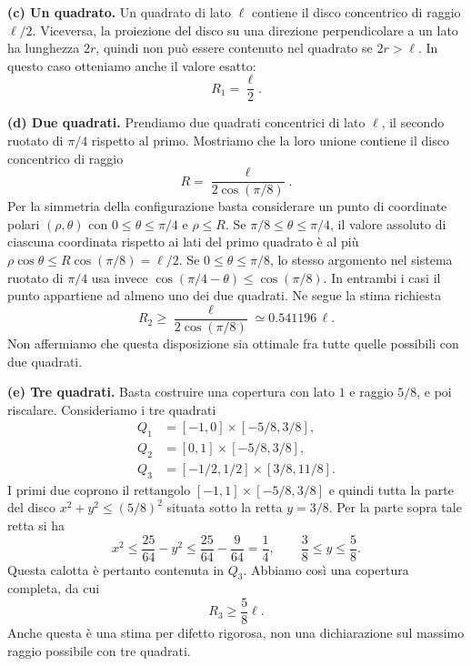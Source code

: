 {\textbf{(c) Un quadrato.}
Un quadrato di lato $\ell$ contiene il disco concentrico di raggio $\ell/2$.
Viceversa, la proiezione del disco su una direzione perpendicolare a un lato
ha lunghezza $2r$, quindi non pu\`o essere contenuto nel quadrato se
$2r>\ell$. In questo caso otteniamo anche il valore esatto:
\[
R_1=\frac\ell2.
\]

\textbf{(d) Due quadrati.}
Prendiamo due quadrati concentrici di lato $\ell$, il secondo ruotato di
$\pi/4$ rispetto al primo. Mostriamo che la loro unione contiene il disco
concentrico di raggio
\[
R=\frac{\ell}{2\cos(\pi/8)}.
\]
Per la simmetria della configurazione basta considerare un punto di
coordinate polari $(\rho,\theta)$ con $0\le\theta\le\pi/4$ e $\rho\le R$.
Se $\pi/8\le\theta\le\pi/4$, il valore assoluto di ciascuna coordinata
rispetto ai lati del primo quadrato \`e al pi\`u
$\rho\cos\theta\le R\cos(\pi/8)=\ell/2$.
Se $0\le\theta\le\pi/8$, lo stesso argomento nel sistema ruotato di
$\pi/4$ usa invece $\cos(\pi/4-\theta)\le\cos(\pi/8)$.
In entrambi i casi il punto appartiene ad almeno uno dei due quadrati.
Ne segue la stima richiesta
\[
R_2\ge\frac{\ell}{2\cos(\pi/8)}\simeq0.541196\,\ell.
\]
Non affermiamo che questa disposizione sia ottimale fra tutte quelle
possibili con due quadrati.

\textbf{(e) Tre quadrati.}
Basta costruire una copertura con lato $1$ e raggio $5/8$, e poi riscalare.
Consideriamo i tre quadrati
\[
\begin{split}
Q_1&=[-1,0]\times[-5/8,3/8],\\
Q_2&=[0,1]\times[-5/8,3/8],\\
Q_3&=[-1/2,1/2]\times[3/8,11/8].
\end{split}
\]
I primi due coprono il rettangolo $[-1,1]\times[-5/8,3/8]$ e quindi tutta
la parte del disco $x^2+y^2\le(5/8)^2$ situata sotto la retta $y=3/8$.
Per la parte sopra tale retta si ha
\[
x^2\le\frac{25}{64}-y^2\le\frac{25}{64}-\frac9{64}=\frac14,
\qquad \frac38\le y\le\frac58.
\]
Questa calotta \`e pertanto contenuta in $Q_3$.
Abbiamo cos\`i una copertura completa, da cui
\[
R_3\ge\frac58\ell.
\]
Anche questa \`e una stima per difetto rigorosa, non una dichiarazione
sul massimo raggio possibile con tre quadrati.
}
\renewcommand{\SoluzioniAlternative}{}
\renewcommand{\Osservazioni}{}
\renewcommand{\Commenti}{}
